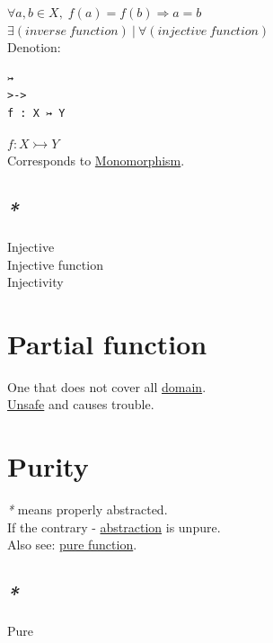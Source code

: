 \documentclass[a4paper,14pt,oneside]{book}
\begin{document}
\(\forall a,b \in X, \; f(a)=f(b) \Rightarrow a=b\)\\

\(\exists (inverse \ function) \ | \ \forall (injective \ function)\)\\

Denotion:\\
\begin{verbatim}
↣
>->
f : X ↣ Y
\end{verbatim}
\(f : X \rightarrowtail Y\)\\

Corresponds to \hyperref[orgd853c38]{Monomorphism}.\\

\subsection{\emph{*}}
\label{sec:orgfee1fd8}

\label{org5cb29d1}Injective\\
\label{orgbaa8ca5}Injective function\\
\label{orgc038910}Injectivity\\

\section{\label{orga1a41e5}Partial function}
\label{sec:orgb84cfa5}
One that does not cover all \hyperref[orge94fc58]{domain}.\\
\hyperref[orge2d33cc]{Unsafe} and causes trouble.\\

\section{\label{org24fdcaa}Purity}
\label{sec:org753984f}
\emph{*} means properly abstracted.\\

If the contrary - \hyperref[orgd003800]{abstraction} is unpure.\\

Also see: \hyperref[org95131ad]{pure function}.\\

\subsection{\emph{*}}
\label{sec:org35a3260}

\label{org6d0d804}Pure\\
\end{document}
